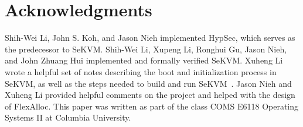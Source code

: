 \section*{Acknowledgments}

Shih-Wei Li, John S. Koh, and Jason Nieh implemented HypSec, which serves as
the predecessor to SeKVM. Shih-Wei Li, Xupeng Li, Ronghui Gu, Jason Nieh, and
John Zhuang Hui implemented and formally verified SeKVM. Xuheng Li wrote a
helpful set of notes describing the boot and initialization process in SeKVM,
as well as the steps needed to build and run SeKVM~\cite{xuheng}. Jason Nieh and
Xuheng Li provided helpful comments on the project and helped with the design
of FlexAlloc. This paper was written as part of the class COMS E6118 Operating
Systems II at Columbia University.










